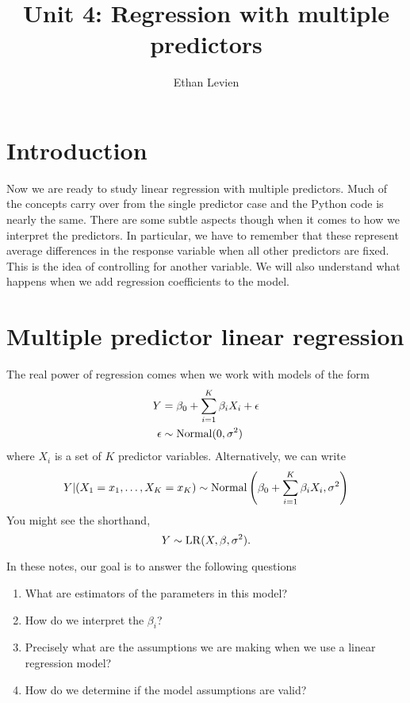 
\setcounter{unit}{4}
\setcounter{section}{0}




\title{Unit 4: Regression with multiple predictors}
\author{Ethan Levien}
\maketitle


\section*{Introduction}
Now we are ready to study linear regression with multiple predictors. Much of the concepts carry over from the single predictor case and the Python code is nearly the same. There are some subtle aspects though when it comes to how we interpret the predictors. In particular, we have to remember that these represent average differences in the response variable when all other predictors are fixed. This is the idea of controlling for another variable. We will also understand what happens when we add regression coefficients to the model. 

\section{Multiple predictor linear regression}
The real power of regression comes when we work with models of the form 
\begin{align}
Y &= \beta_0 + \sum_{i=1}^K \beta_iX_i + \epsilon\\
\epsilon &\sim {\rm Normal}(0,\sigma^2)
\end{align}
where $X_i$ is a set of $K$ predictor variables. Alternatively, we can write
\begin{equation}
Y|(X_1=x_1,\dots,X_K=x_K) \sim {\rm Normal}\left( \beta_0 + \sum_{i=1}^K \beta_iX_i,\sigma^2\right)
\end{equation}
You might see the shorthand, 
\begin{equation}
Y \sim {\rm LR}(X,\beta,\sigma^2). 
\end{equation}

In these notes, our goal is to answer the following questions
\begin{enumerate}
\item What are estimators of the parameters in this model?
\item How do we interpret the  $\beta_i$? 
\item Precisely what are the assumptions we are making when we use a linear regression model? 
\item How do we determine if the model assumptions are valid? 
\end{enumerate}



